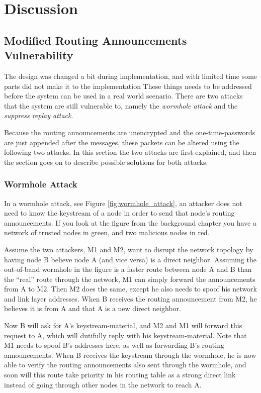 \chapter{Discussion}
\label{ch:discussion}
\acresetall

\section{Modified Routing Announcements Vulnerability}
The design was changed a bit during implementation, and with limited time some
parts did not make it to the implementation These things needs to be addressed
before the system can be used in a real world scenario. There are two attacks
that the system are still vulnerable to, namely the \emph{wormhole attack} and
the \emph{suppress replay attack}.

Because the routing announcements are unencrypted and the one-time-passwords
are just appended after the messages, these packets can be altered using the
following two attacks. In this section the two attacks are first explained, and
then the section goes on to describe possible solutions for both attacks.

\subsection{Wormhole Attack}
In a wormhole attack, see Figure \ref{fig:wormhole_attack}, an attacker does not
need to know the keystream of a node in order to send that node's routing
announcements. If you look at the figure from the background chapter you have a
network of trusted nodes in green, and two malicious nodes in red. 

Assume the two attackers, M1 and M2, want to disrupt the network topology by
having node B believe node A (and vice versa) is a direct neighbor. Assuming the
out-of-band wormhole in the figure is a faster route between node A and B than
the ``real'' route through the network, M1 can simply forward the announcements
from A to M2. Then M2 does the same, except he also needs to spoof his network
and link layer addresses. When B receives the routing announcement from M2, he
believes it is from A and that A is a new direct neighbor.

Now B will ask for A's keystream-material, and M2 and M1 will forward this
request to A, which will dutifully reply with his keystream-material. Note that
M1 needs to spoof B's addresses here, as well as forwarding B's routing
announcements. When B receives the keystream through the wormhole, he is now
able to verify the routing announcements also sent through the wormhole, and
soon will this route take priority in his routing table as a strong direct link
instead of going through other nodes in the network to reach A.

